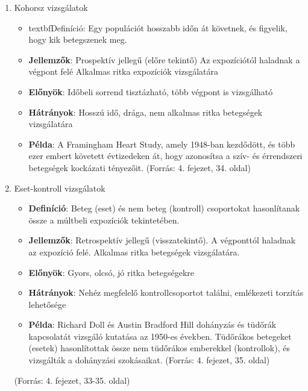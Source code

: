 \documentclass[a4paper,12pt]{article}
\begin{document}
    \begin{enumerate}[label=(\alph*)]

        \item Kohorsz vizsgálatok

        \begin{itemize}
            \item textbf{Definíció}: Egy populációt hosszabb időn át követnek, és figyelik, hogy kik betegszenek meg.

            \item \textbf{Jellemzők}: Prospektív jellegű (előre tekintő)
            Az expozíciótól haladnak a végpont felé
            Alkalmas ritka expozíciók vizsgálatára

            \item  \textbf{Előnyök}: Időbeli sorrend tisztázható, több végpont is vizsgálható

            \item \textbf{Hátrányok}: Hosszú idő, drága, nem alkalmas ritka betegségek vizsgálatára

            \item \textbf{Példa}: A Framingham Heart Study, amely 1948-ban kezdődött, és több ezer embert követett évtizedeken át, hogy azonosítsa a szív- és érrendszeri betegségek kockázati tényezőit. (Forrás: 4. fejezet, 34. oldal)
        \end{itemize}

        \item Eset-kontroll vizsgálatok
        \begin{itemize}

            \item \textbf{Definíció}: Beteg (eset) és nem beteg (kontroll) csoportokat hasonlítanak össze a múltbeli expozíciók tekintetében.

            \item \textbf{Jellemzők}: Retrospektív jellegű (visszatekintő). A végponttól haladnak az expozíció felé. Alkalmas ritka betegségek vizsgálatára.


            \item \textbf{Előnyök}: Gyors, olcsó, jó ritka betegségekre

            \item \textbf{Hátrányok}: Nehéz megfelelő kontrollcsoportot találni, emlékezeti torzítás lehetősége

            \item \textbf{Példa}: Richard Doll és Austin Bradford Hill dohányzás és tüdőrák kapcsolatát vizsgáló kutatása az 1950-es években. Tüdőrákos betegeket (esetek) hasonlítottak össze nem tüdőrákos emberekkel (kontrollok), és vizsgálták a dohányzási szokásaikat. (Forrás: 4. fejezet, 35. oldal)

        \end{itemize}
        (Forrás: 4. fejezet, 33-35. oldal)

    \end{enumerate}
\end{document}
